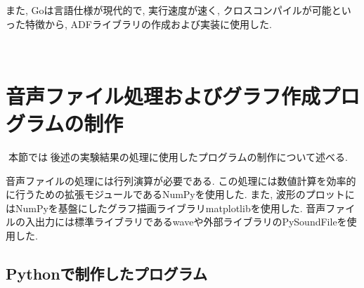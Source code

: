 また, Goは言語仕様が現代的で, 実行速度が速く, クロスコンパイルが可能といった特徴から, ADFライブラリの作成および実装に使用した. 



\
\section{音声ファイル処理およびグラフ作成プログラムの制作}\label{create-program}

本節では後述の実験結果の処理に使用したプログラムの制作について述べる. 

音声ファイルの処理には行列演算が必要である. この処理には数値計算を効率的に行うための拡張モジュールであるNumPyを使用した. また, 波形のプロットにはNumPyを基盤にしたグラフ描画ライブラリmatplotlibを使用した. 
音声ファイルの入出力には標準ライブラリであるwaveや外部ライブラリのPySoundFileを使用した. 


\subsection{Pythonで制作したプログラム}\label{python}

